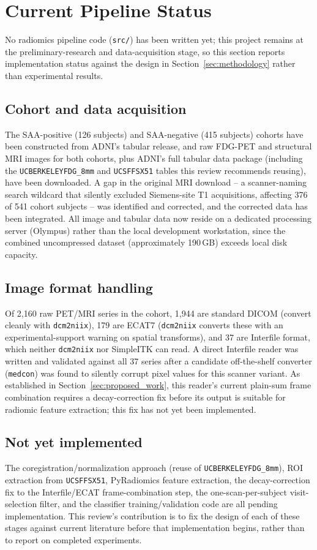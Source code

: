 \section{Current Pipeline Status}
\label{sec:results}

No radiomics pipeline code (\texttt{src/}) has been written yet; this project remains at the preliminary-research and data-acquisition stage, so this section reports implementation status against the design in Section~\ref{sec:methodology} rather than experimental results.

\subsection{Cohort and data acquisition}
The SAA-positive (126 subjects) and SAA-negative (415 subjects) cohorts have been constructed from ADNI's tabular release, and raw FDG-PET and structural MRI images for both cohorts, plus ADNI's full tabular data package (including the \texttt{UCBERKELEYFDG\_8mm} and \texttt{UCSFFSX51} tables this review recommends reusing), have been downloaded. A gap in the original MRI download -- a scanner-naming search wildcard that silently excluded Siemens-site T1 acquisitions, affecting 376 of 541 cohort subjects -- was identified and corrected, and the corrected data has been integrated. All image and tabular data now reside on a dedicated processing server (Olympus) rather than the local development workstation, since the combined uncompressed dataset (approximately 190\,GB) exceeds local disk capacity.

\subsection{Image format handling}
Of 2{,}160 raw PET/MRI series in the cohort, 1{,}944 are standard DICOM (convert cleanly with \texttt{dcm2niix}), 179 are ECAT7 (\texttt{dcm2niix} converts these with an experimental-support warning on spatial transforms), and 37 are Interfile format, which neither \texttt{dcm2niix} nor SimpleITK can read. A direct Interfile reader was written and validated against all 37 series after a candidate off-the-shelf converter (\texttt{medcon}) was found to silently corrupt pixel values for this scanner variant. As established in Section~\ref{sec:proposed_work}, this reader's current plain-sum frame combination requires a decay-correction fix before its output is suitable for radiomic feature extraction; this fix has not yet been implemented.

\subsection{Not yet implemented}
The coregistration/normalization approach (reuse of \texttt{UCBERKELEYFDG\_8mm}), ROI extraction from \texttt{UCSFFSX51}, PyRadiomics feature extraction, the decay-correction fix to the Interfile/ECAT frame-combination step, the one-scan-per-subject visit-selection filter, and the classifier training/validation code are all pending implementation. This review's contribution is to fix the design of each of these stages against current literature before that implementation begins, rather than to report on completed experiments.
